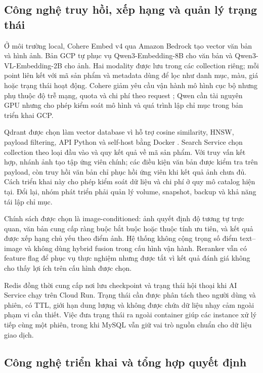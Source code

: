\subsection{Công nghệ truy hồi, xếp hạng và quản lý trạng thái}

Ở môi trường local, Cohere Embed v4 qua Amazon Bedrock tạo vector văn bản và hình
ảnh. Bản GCP tự phục vụ Qwen3-Embedding-8B cho văn bản và
Qwen3-VL-Embedding-2B cho ảnh. Hai modality được lưu trong các collection
riêng; mỗi point liên kết với mã sản phẩm và metadata dùng để lọc như danh mục,
màu, giá hoặc trạng thái hoạt động. Cohere giảm yêu cầu vận hành mô hình cục bộ
nhưng phụ thuộc độ trễ mạng, quota và chi phí theo request
\parencite{cohereembedv42026}; Qwen cần tài nguyên GPU nhưng cho phép kiểm soát mô
hình và quá trình lập chỉ mục trong bản triển khai GCP.

Qdrant được chọn làm vector database vì hỗ trợ cosine similarity, HNSW, payload
filtering, API Python và self-host bằng Docker \parencite{qdrant_docs}. Search Service
chọn collection theo loại đầu vào và quy kết quả về mã sản phẩm. Với truy vấn kết
hợp, nhánh ảnh tạo tập ứng viên chính; các điều kiện văn bản được kiểm tra trên
payload, còn truy hồi văn bản chỉ phục hồi ứng viên khi kết quả ảnh chưa đủ. Cách
triển khai này cho phép kiểm soát dữ liệu và chi phí ở quy mô catalog hiện tại. Đổi
lại, nhóm phát triển phải quản lý volume, snapshot, backup và khả năng tái lập chỉ mục.

Chính sách được chọn là image-conditioned: ảnh quyết định độ tương tự trực quan,
văn bản cung cấp ràng buộc bắt buộc hoặc thuộc tính ưu tiên, và kết quả được xếp
hạng chủ yếu theo điểm ảnh. Hệ thống không cộng trọng số điểm text--image và không
dùng hybrid fusion trong cấu hình vận hành. Reranker vẫn có feature flag để phục vụ
thực nghiệm nhưng được tắt vì kết quả đánh giá không cho thấy lợi ích trên cấu hình
được chọn.

Redis đồng thời cung cấp nơi lưu checkpoint và trạng thái hội thoại khi AI Service
chạy trên Cloud Run. Trạng thái cần được phân tách theo người dùng và phiên, có TTL,
giới hạn dung lượng và không được chứa dữ liệu nhạy cảm ngoài phạm vi cần thiết. Việc
đưa trạng thái ra ngoài container giúp các instance xử lý tiếp cùng một phiên, trong
khi MySQL vẫn giữ vai trò nguồn chuẩn cho dữ liệu giao dịch.

\subsection{Công nghệ triển khai và tổng hợp quyết định}

